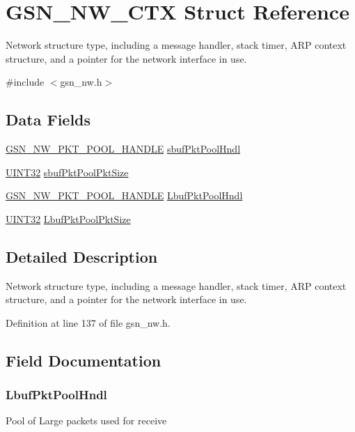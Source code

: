\hypertarget{a00164}{
\section{GSN\_\-NW\_\-CTX Struct Reference}
\label{a00164}
}


Network structure type, including a message handler, stack timer, ARP context structure, and a pointer for the network interface in use.  




{\ttfamily \#include $<$gsn\_\-nw.h$>$}

\subsection*{Data Fields}
\begin{DoxyCompactItemize}
\item 
\hyperlink{a00532_afccc5835aa5e2916600678de68186848}{GSN\_\-NW\_\-PKT\_\-POOL\_\-HANDLE} \hyperlink{a00164_a8505ded3aa3e411e22a897e74c1603a6}{sbufPktPoolHndl}
\item 
\hyperlink{a00660_gae1e6edbbc26d6fbc71a90190d0266018}{UINT32} \hyperlink{a00164_a42386fb051a55ad1c912c6cab2f5aae4}{sbufPktPoolPktSize}
\item 
\hyperlink{a00532_afccc5835aa5e2916600678de68186848}{GSN\_\-NW\_\-PKT\_\-POOL\_\-HANDLE} \hyperlink{a00164_a1a12ab4520fb68c3978c4ba3bbef3177}{LbufPktPoolHndl}
\item 
\hyperlink{a00660_gae1e6edbbc26d6fbc71a90190d0266018}{UINT32} \hyperlink{a00164_a3acb08aea3a6eb76474385d92513ffb6}{LbufPktPoolPktSize}
\end{DoxyCompactItemize}


\subsection{Detailed Description}
Network structure type, including a message handler, stack timer, ARP context structure, and a pointer for the network interface in use. 

Definition at line 137 of file gsn\_\-nw.h.



\subsection{Field Documentation}
\hypertarget{a00164_a1a12ab4520fb68c3978c4ba3bbef3177}{
\subsubsection[{LbufPktPoolHndl}]{ {\bf LbufPktPoolHndl}}}
\label{a00164_a1a12ab4520fb68c3978c4ba3bbef3177}
Pool of Large packets used for receive 

